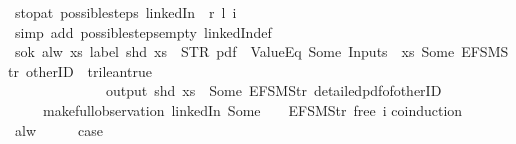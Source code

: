 \begin{isabellebody}
%
\endisadelimproof
\isanewline
{}\isamarkupfalse%
\ stop{\isacharunderscore}at{\isacharunderscore}{}{\isacharcolon}\ {\isachardoublequoteopen}possible{\isacharunderscore}steps\ linkedIn\ {}\ r\ l\ i\ {\isacharequal}\ {\isacharbraceleft}{\isacharbar}{\isacharbar}{\isacharbraceright}{\isachardoublequoteclose}\isanewline
%
\isadelimproof
\ \ %
\endisadelimproof
%
\isatagproof
{}\isamarkupfalse%
\ {\isacharparenleft}simp\ add{\isacharcolon}\ possible{\isacharunderscore}steps{\isacharunderscore}empty\ linkedIn{\isacharunderscore}def{\isacharparenright}%
\endisatagproof
{\isafoldproof}%
%
\isadelimproof
\isanewline
%
\endisadelimproof
\isanewline
{}\isamarkupfalse%
\ s{}{\isacharunderscore}ok{\isacharcolon}\ {\isachardoublequoteopen}alw\ {\isacharparenleft}{\isasymlambda}xs{\isachardot}\ label\ {\isacharparenleft}shd\ xs{\isacharparenright}\ {\isacharequal}\ STR\ {\isacharprime}{\isacharprime}pdf{\isacharprime}{\isacharprime}\ {\isasymand}\ ValueEq\ {\isacharparenleft}Some\ {\isacharparenleft}Inputs\ {}\ xs{\isacharparenright}{\isacharparenright}\ {\isacharparenleft}Some\ {\isacharparenleft}EFSM{\isachardot}Str\ {\isacharprime}{\isacharprime}otherID{\isacharprime}{\isacharprime}{\isacharparenright}{\isacharparenright}\ {\isacharequal}\ trilean{\isachardot}true\ {\isasymlongrightarrow}\isanewline
\ \ \ \ \ \ \ \ \ \ \ \ \ \ output\ {\isacharparenleft}shd\ xs{\isacharparenright}\ {\isasymnoteq}\ {\isacharbrackleft}Some\ {\isacharparenleft}EFSM{\isachardot}Str\ {\isacharprime}{\isacharprime}detailed{\isacharunderscore}pdf{\isacharunderscore}of{\isacharunderscore}otherID{\isacharprime}{\isacharprime}{\isacharparenright}{\isacharbrackright}{\isacharparenright}\isanewline
\ \ \ \ \ {\isacharparenleft}make{\isacharunderscore}full{\isacharunderscore}observation\ linkedIn\ {\isacharparenleft}Some\ {}{\isacharparenright}\ {\isacharparenleft}{\isacharless}{\isachargreater}{\isacharparenleft}{}\ {\isacharcolon}{\isacharequal}\ EFSM{\isachardot}Str\ {\isacharprime}{\isacharprime}free{\isacharprime}{\isacharprime}{\isacharparenright}{\isacharparenright}\ i{\isacharparenright}{\isachardoublequoteclose}\isanewline
%
\isadelimproof
%
\endisadelimproof
%
\isatagproof
{}\isamarkupfalse%
{\isacharparenleft}coinduction{\isacharparenright}\isanewline
\ \ \isamarkupfalse%
\ alw\isanewline
\ \ \isamarkupfalse%
\ \isamarkupfalse%
\ {\isacharquery}case\isanewline
\ \ \ \ \isamarkupfalse%

\end{isabellebody}
